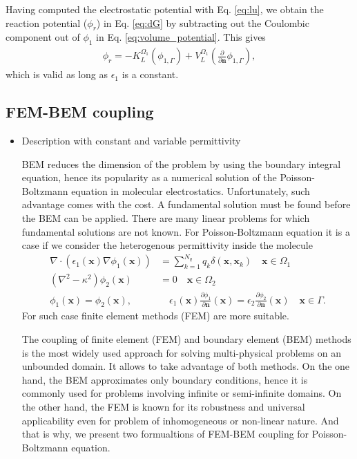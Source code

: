 Having computed the electrostatic potential with Eq. \eqref{eq:lu}, we obtain the reaction potential ($\phi_r$) in Eq. \eqref{eq:dG} by subtracting out the Coulombic component out of $\phi_1$ in Eq. \eqref{eq:volume_potential}. This gives
%
\begin{align} \label{eq:phi_reac}
\phi_{r} = - K_{L}^{\Omega_1}(\phi_{1,\Gamma}) + V_{L}^{\Omega_1} \left(\frac{\partial}{\partial \mathbf{n}}  \phi_{1,\Gamma}  \right),
\end{align}
%
which is valid as long as $\epsilon_1$ is a constant.

\subsection*{\sffamily \large FEM-BEM coupling}

\begin{itemize}
    \item Description with constant and variable permittivity 
    
BEM reduces the dimension of the problem by using the boundary integral equation, hence its popularity as a numerical solution of  the Poisson-Boltzmann equation in molecular electrostatics. Unfortunately, such advantage comes with the cost. A fundamental solution must be found before the BEM can be applied. There are many linear problems for which fundamental solutions are not known. For Poisson-Boltzmann equation it is a case if we consider the heterogenous permittivity inside the molecule
   \begin{align} \label{eq:pbe_vp}
\nabla \cdot \left(\epsilon_1(\mathbf{x}) \nabla \phi_1(\mathbf{x})\right) &= \sum_{k=1}^{N_q} q_k\delta(\mathbf{x},\mathbf{x}_k) \quad  \mathbf{x} \in \Omega_1\nonumber\\
\left(\nabla^2 - \kappa^2\right)\phi_2(\mathbf{x})  &= 0 \quad\mathbf{x}\in\Omega_2\nonumber\\
\phi_1(\mathbf{x})  = \phi_2(\mathbf{x}),  &\quad \epsilon_1(\mathbf{x})\frac{\partial\phi_1}{\partial\mathbf{n}}(\mathbf{x})  = \epsilon_2\frac{\partial\phi_2}{\partial\mathbf{n}}(\mathbf{x})  \quad \mathbf{x}\in \Gamma. 
\end{align}
For such case finite element methods (FEM) are more suitable.

The coupling of finite element (FEM) and boundary element (BEM) methods is the most widely used approach for solving multi-physical problems on an unbounded domain. It allows to take advantage of both methods. On the one hand, the BEM approximates only boundary conditions, hence it is commonly used for problems involving infinite or semi-infinite domains. On the other hand, the FEM is known for its robustness and universal applicability even for problem of inhomogeneous or non-linear nature.
And that is why, we present two formualtions of FEM-BEM coupling for Poisson-Boltzmann equation.
    

\end{itemize}
